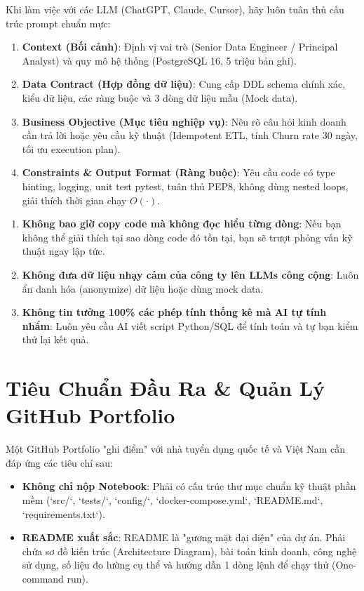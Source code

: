\begin{aipromptbox}
Khi làm việc với các LLM (ChatGPT, Claude, Cursor), hãy luôn tuân thủ cấu trúc prompt chuẩn mực:
\begin{enumerate}
    \item \textbf{Context (Bối cảnh)}: Định vị vai trò (Senior Data Engineer / Principal Analyst) và quy mô hệ thống (PostgreSQL 16, 5 triệu bản ghi).
    \item \textbf{Data Contract (Hợp đồng dữ liệu)}: Cung cấp DDL schema chính xác, kiểu dữ liệu, các ràng buộc và 3 dòng dữ liệu mẫu (Mock data).
    \item \textbf{Business Objective (Mục tiêu nghiệp vụ)}: Nêu rõ câu hỏi kinh doanh cần trả lời hoặc yêu cầu kỹ thuật (Idempotent ETL, tính Churn rate 30 ngày, tối ưu execution plan).
    \item \textbf{Constraints \& Output Format (Ràng buộc)}: Yêu cầu code có type hinting, logging, unit test pytest, tuân thủ PEP8, không dùng nested loops, giải thích thời gian chạy $O(\cdot)$.
\end{enumerate}
\end{aipromptbox}

\begin{thuchanhbox}
\begin{enumerate}
    \item \textbf{Không bao giờ copy code mà không đọc hiểu từng dòng}: Nếu bạn không thể giải thích tại sao dòng code đó tồn tại, bạn sẽ trượt phỏng vấn kỹ thuật ngay lập tức.
    \item \textbf{Không đưa dữ liệu nhạy cảm của công ty lên LLMs công cộng}: Luôn ẩn danh hóa (anonymize) dữ liệu hoặc dùng mock data.
    \item \textbf{Không tin tưởng 100\% các phép tính thống kê mà AI tự tính nhẩm}: Luôn yêu cầu AI viết script Python/SQL để tính toán và tự bạn kiểm thử lại kết quả.
\end{enumerate}
\end{thuchanhbox}

\section{Tiêu Chuẩn Đầu Ra \& Quản Lý GitHub Portfolio}

Một GitHub Portfolio "ghi điểm" với nhà tuyển dụng quốc tế và Việt Nam cần đáp ứng các tiêu chí sau:
\begin{itemize}
    \item \textbf{Không chỉ nộp Notebook}: Phải có cấu trúc thư mục chuẩn kỹ thuật phần mềm (`src/`, `tests/`, `config/`, `docker-compose.yml`, `README.md`, `requirements.txt`).
    \item \textbf{README xuất sắc}: README là "gương mặt đại diện" của dự án. Phải chứa sơ đồ kiến trúc (Architecture Diagram), bài toán kinh doanh, công nghệ sử dụng, số liệu đo lường cụ thể và hướng dẫn 1 dòng lệnh để chạy thử (One-command run).
\end{itemize}

